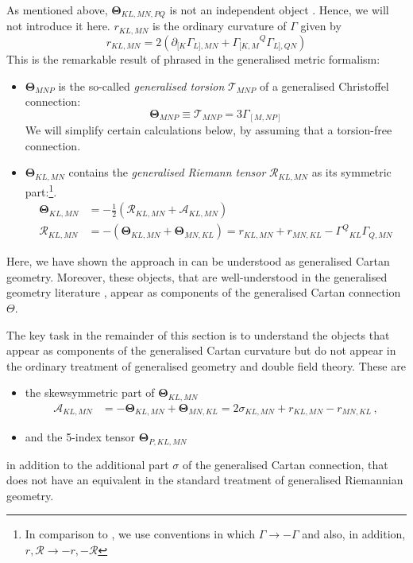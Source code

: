 \documentclass[11pt,a4paper]{article}
\numberwithin{equation}{section}
\begin{document}
As mentioned above, $\mathbf{\Theta}_{KL,MN,PQ}$ is not an independent object \cite{Butter:2021dtu}. Hence, we will not introduce it here. $r_{KL,MN}$ is the ordinary curvature of $\Gamma$ given by
\begin{equation}
r_{KL,MN} = 2 \left( \partial_{[K} {\Gamma_{L],MN}} + {\Gamma_{[K,M}}^Q {\Gamma_{L],QN}} \right)
\end{equation}
This is the remarkable result of \cite{Polacek:2013nla} phrased in the generalised metric formalism:
\begin{itemize}
    \item $\mathbf{\Theta}_{MNP}$ is the so-called \textit{generalised torsion} $\mathcal{T}_{MNP}$ of a generalised Christoffel connection:
     \begin{equation}
         \mathbf{\Theta}_{MNP} \equiv \mathcal{T}_{MNP} = 3 \Gamma_{[M,NP]}
     \end{equation}
     We will simplify certain calculations below, by assuming that a torsion-free connection. 
    \item $\mathbf{\Theta}_{KL,MN}$ contains the \textit{generalised Riemann tensor} $\mathcal{R}_{KL,MN}$ \cite{Hohm:2011si} as its symmetric part:\footnote{In comparison to \cite{Hohm:2011si}, we use conventions in which $\Gamma \rightarrow - \Gamma$ and also, in addition, $r, \mathcal{R} \rightarrow -r , -\mathcal{R}$ }.
    \begin{align}
    \mathbf{\Theta}_{KL,MN} &= - \frac{1}{2} \left( \mathcal{R}_{KL,MN} + \mathcal{A}_{KL,MN} \right) \\
	\mathcal{R}_{KL,MN} &= - (\mathbf{\Theta}_{KL,MN} + \mathbf{\Theta}_{MN,KL}) = r_{KL,MN} + r_{MN,KL} - {\Gamma^Q}_{KL} \Gamma_{Q,MN}
	\end{align}
\end{itemize}
Here, we have shown the approach in \cite{Polacek:2013nla} can be understood as generalised Cartan geometry. Moreover, these objects, that are well-understood in the generalised geometry literature \cite{Jeon:2010rw,Coimbra:2011nw,Hohm:2011si}, appear as components of the generalised Cartan connection $\Theta$.

The key task in the remainder of this section is to understand the objects that appear as components of the generalised Cartan curvature but do not appear in the ordinary treatment of generalised geometry and double field theory. These are
\begin{itemize}
    \item the skewsymmetric part of $\mathbf{\Theta}_{KL,MN}$
\begin{align}
	\mathcal{A}_{KL,MN} &= - \mathbf{\Theta}_{KL,MN} + \mathbf{\Theta}_{MN,KL} = 2 \sigma_{KL,MN} + r_{KL,MN} - r_{MN,KL}\,,
\end{align}
    \item and the 5-index tensor $\mathbf{\Theta}_{P,KL,MN}$
\end{itemize}
in addition to the additional part $\sigma$ of the generalised Cartan connection, that does not have an equivalent in the standard treatment of generalised Riemannian geometry.
\end{document}
